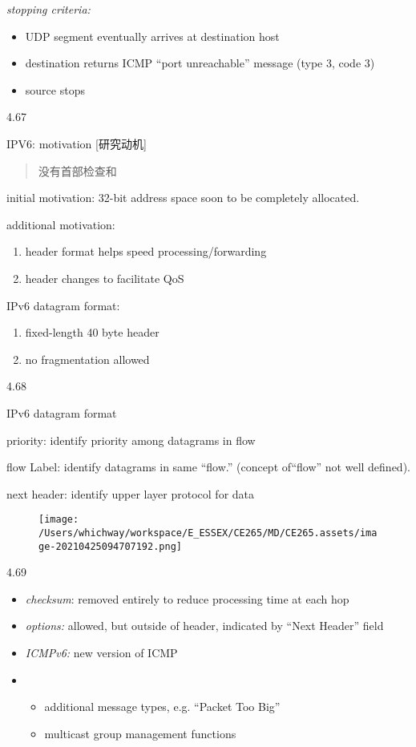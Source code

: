 \documentclass[
]{article}
\begin{document}
\emph{stopping criteria:}

\begin{itemize}
\item
  UDP segment eventually arrives at destination host
\item
  destination returns ICMP ``port unreachable'' message (type 3, code 3)
\item
  source stops
\end{itemize}

4.67

IPV6: motivation {[}研究动机{]}

\begin{quote}
没有首部检查和
\end{quote}

initial motivation: 32-bit address space soon to be completely
allocated.

additional motivation:

\begin{enumerate}
\def\labelenumi{\arabic{enumi}.}
\item
  header format helps speed processing/forwarding
\item
  header changes to facilitate QoS
\end{enumerate}

IPv6 datagram format:

\begin{enumerate}
\def\labelenumi{\arabic{enumi}.}
\item
  fixed-length 40 byte header
\item
  no fragmentation allowed
\end{enumerate}

4.68

IPv6 datagram format

priority: identify priority among datagrams in flow

flow Label: identify datagrams in same ``flow.'' (concept of``flow'' not
well defined).

next header: identify upper layer protocol for data

\begin{figure}
\centering
\texttt{[image: /Users/whichway/workspace/E\_ESSEX/CE265/MD/CE265.assets/image-20210425094707192.png]}
\caption{}
\end{figure}

4.69

\begin{itemize}
\item
  \emph{checksum}: removed entirely to reduce processing time at each
  hop
\item
  \emph{options:} allowed, but outside of header, indicated by ``Next
  Header'' field
\item
  \emph{ICMPv6:} new version of ICMP
\item
  \begin{itemize}
  \item
    additional message types, e.g. ``Packet Too Big''
  \item
    multicast group management functions
  \end{itemize}
\end{itemize}
\end{document}
